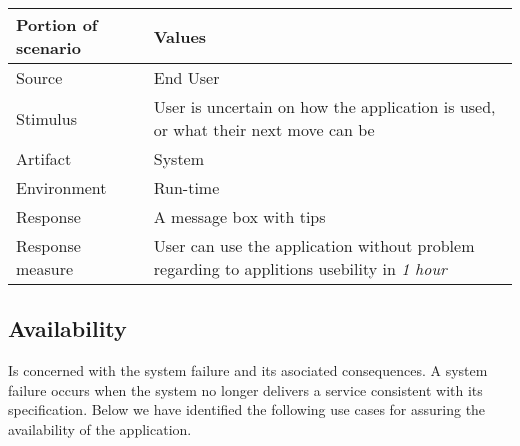 \begin{itemize}
        \begin{tabular}{| l | p{7cm} |}
            \hline
            \rowcolor[gray]{0.8}
            \textbf{Portion of scenario} & \textbf{Values} \\
            \hline
            Source & End User \\
            Stimulus & User is uncertain on how the application is used, or what their next move can be \\
            Artifact & System \\
            Environment & Run-time \\
            Response & A message box with tips \\
            Response measure  & User can use the application without problem regarding to applitions usebility in \emph{1 hour}\\
            \hline
        \end{tabular}
\end{itemize}

\subsection{Availability}
Is concerned with the system failure and its asociated consequences. A system failure occurs when the system no longer delivers a service consistent with its specification\cite{ProgarkPensum}. Below we have identified the following use cases for assuring the availability of the application.

